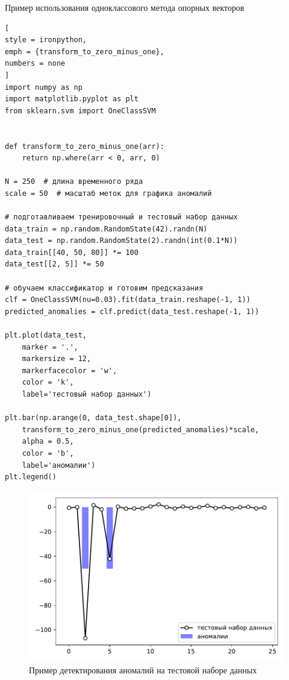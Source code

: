\documentclass[%
	11pt,
	a4paper,
	utf8,
		]{article}
\begin{document}
Пример использования одноклассового метода опорных векторов
\begin{lstlisting}[
style = ironpython,
emph = {transform_to_zero_minus_one},
numbers = none
]
import numpy as np
import matplotlib.pyplot as plt
from sklearn.svm import OneClassSVM


def transform_to_zero_minus_one(arr):
    return np.where(arr < 0, arr, 0)

N = 250  # длина временного ряда
scale = 50  # масштаб меток для графика аномалий

# подготавливаем тренировочный и тестовый набор данных
data_train = np.random.RandomState(42).randn(N)
data_test = np.random.RandomState(2).randn(int(0.1*N))
data_train[[40, 50, 80]] *= 100
data_test[[2, 5]] *= 50

# обучаем классификатор и готовим предсказания
clf = OneClassSVM(nu=0.03).fit(data_train.reshape(-1, 1))
predicted_anomalies = clf.predict(data_test.reshape(-1, 1))

plt.plot(data_test,
    marker = '.',
    markersize = 12,
    markerfacecolor = 'w',
    color = 'k',
    label='тестовый набор данных')

plt.bar(np.arange(0, data_test.shape[0]),
    transform_to_zero_minus_one(predicted_anomalies)*scale,
    alpha = 0.5,
    color = 'b',
    label='аномалии')
plt.legend()
\end{lstlisting}

\begin{figure}[h]
	\centering
	\includegraphics[scale=0.55]{figures/oneclasssvm_test.pdf}
	\caption{ Пример детектирования аномалий на тестовой наборе данных }\label{fig:oneclasssvm}
\end{figure}
\end{document}
